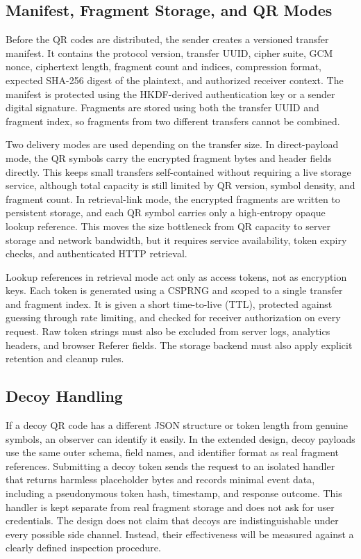\documentclass[conference]{IEEEtran}
\begin{document}
\subsection{Manifest, Fragment Storage, and QR Modes}
Before the QR codes are distributed, the sender creates a versioned transfer manifest. It contains the protocol version, transfer UUID, cipher suite, GCM nonce, ciphertext length, fragment count and indices, compression format, expected SHA-256 digest of the plaintext, and authorized receiver context. The manifest is protected using the HKDF-derived authentication key or a sender digital signature. Fragments are stored using both the transfer UUID and fragment index, so fragments from two different transfers cannot be combined.

Two delivery modes are used depending on the transfer size. In direct-payload mode, the QR symbols carry the encrypted fragment bytes and header fields directly. This keeps small transfers self-contained without requiring a live storage service, although total capacity is still limited by QR version, symbol density, and fragment count. In retrieval-link mode, the encrypted fragments are written to persistent storage, and each QR symbol carries only a high-entropy opaque lookup reference. This moves the size bottleneck from QR capacity to server storage and network bandwidth, but it requires service availability, token expiry checks, and authenticated HTTP retrieval.

Lookup references in retrieval mode act only as access tokens, not as encryption keys. Each token is generated using a CSPRNG and scoped to a single transfer and fragment index. It is given a short time-to-live (TTL), protected against guessing through rate limiting, and checked for receiver authorization on every request. Raw token strings must also be excluded from server logs, analytics headers, and browser Referer fields. The storage backend must also apply explicit retention and cleanup rules.

\subsection{Decoy Handling}
If a decoy QR code has a different JSON structure or token length from genuine symbols, an observer can identify it easily. In the extended design, decoy payloads use the same outer schema, field names, and identifier format as real fragment references. Submitting a decoy token sends the request to an isolated handler that returns harmless placeholder bytes and records minimal event data, including a pseudonymous token hash, timestamp, and response outcome. This handler is kept separate from real fragment storage and does not ask for user credentials. The design does not claim that decoys are indistinguishable under every possible side channel. Instead, their effectiveness will be measured against a clearly defined inspection procedure.
\end{document}
